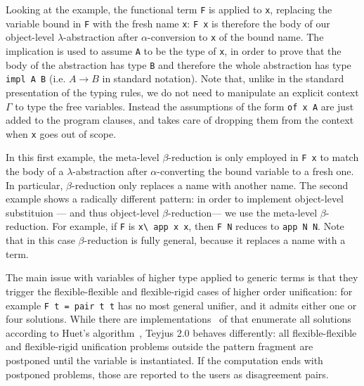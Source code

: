\documentclass{llncs}
\begin{document}
Looking at the example, the functional term \verb+F+ is applied to \verb+x+, replacing the variable bound in \verb+F+ with the fresh name \verb+x+: \verb+F x+ is therefore the body of our object-level $\lambda$-abstraction after $\alpha$-conversion to \verb+x+ of the bound name. The implication is used to assume \verb+A+ to be the type of \verb+x+, in order to prove that the body of the abstraction has type \verb+B+ and therefore the whole abstraction has type \verb+impl A B+ (i.e. $A \to B$ in standard notation). Note that, unlike in the standard presentation of the typing rules, we do not need to manipulate an explicit context $\Gamma$ to type the free variables. Instead the assumptions of the form \verb+of x A+ are just added to the program clauses, and \lp{} takes care of dropping them from the context when \verb+x+ goes out of scope.

In this first example, the meta-level $\beta$-reduction is only employed in \verb+F x+ to match the body of a $\lambda$-abstraction after $\alpha$-converting the bound variable to a fresh one. In particular, $\beta$-reduction only replaces a name with another name.
The second example shows a radically different pattern: in order to implement object-level substituion --- and thus object-level $\beta$-reduction--- we use the meta-level $\beta$-reduction. For example, if
\verb+F+ is \verb+x\ app x x+, then \verb+F N+ reduces to \verb+app N N+.
Note that in this case $\beta$-reduction is fully general, because it replaces
a name with a term.

The main issue with variables of higher type applied to generic terms is
that they trigger the flexible-flexible and flexible-rigid cases of
higher order unification: for example \verb+F t = pair t t+ has no most general
unifier, and it admits either one or four solutions. While there are implementations~\cite{isabelle?} of \lp{} that enumerate all solutions according to Huet's algorithm~\cite{???}, Teyjus 2.0 behaves differently: all flexible-flexible and flexible-rigid unification problems outside the pattern fragment are postponed until the variable is instantiated. If the computation ends with postponed problems, those are reported to the users as disagreement pairs.
\end{document}
